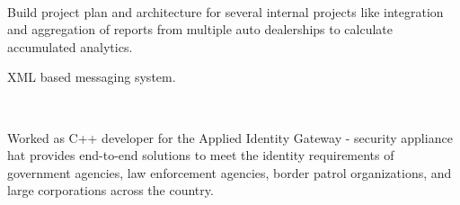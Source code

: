 \documentclass[]{hieudo-build}
\begin{document}
\begin{minipage}[t]{0.65\textwidth}
 \\
\begin{tightemize}
\item Build project plan and architecture for several internal projects like integration and aggregation of reports from multiple auto dealerships to calculate accumulated analytics. 
\item XML based messaging system.
\end{tightemize}
\sectionsep

 \\
\begin{tightemize}
\item Worked as C++ developer for the Applied Identity Gateway - security appliance hat provides end-to-end solutions to meet the identity requirements of government agencies, law enforcement agencies, border patrol organizations, and large corporations across the country. 
\end{tightemize}
\sectionsep




\end{minipage}
\end{document}

